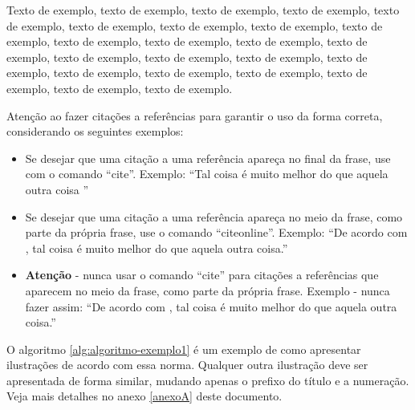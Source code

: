 \documentclass[
	12pt,				%
	oneside,			%
	a4paper,			%
	english,			%
	brazil				%
	]{abntex2ppgsi}
\begin{document}
Texto de exemplo, texto de exemplo, texto de exemplo, texto de exemplo, texto de exemplo, texto de exemplo, texto de exemplo, texto de exemplo, texto de exemplo, texto de exemplo, texto de exemplo, texto de exemplo, texto de exemplo, texto de exemplo, texto de exemplo, texto de exemplo, texto de exemplo, texto de exemplo, texto de exemplo, texto de exemplo, texto de exemplo, texto de exemplo, texto de exemplo.

Atenção ao fazer citações a referências para garantir o uso da forma correta, considerando os seguintes exemplos:
\begin{itemize}
	\item Se desejar que uma citação a uma referência apareça no final da frase, use com o comando ``cite''. Exemplo: ``Tal coisa é muito melhor do que aquela outra coisa \cite{teste1, teste2}''
	\item Se desejar que uma citação a uma referência apareça no meio da frase, como parte da própria frase, use o comando ``citeonline''. Exemplo: ``De acordo com , tal coisa é muito melhor do que aquela outra coisa.''
	\item \textbf{Atenção} - nunca usar o comando ``cite'' para citações a referências que aparecem no meio da frase, como parte da própria frase. Exemplo - nunca fazer assim: ``De acordo com \cite{teste3}, tal coisa é muito melhor do que aquela outra coisa.''
\end{itemize}

O algoritmo \ref{alg:algoritmo-exemplo1} é um exemplo de como apresentar ilustrações de acordo com essa norma. Qualquer outra ilustração deve ser apresentada de forma similar, mudando apenas o prefixo do título e a numeração. Veja mais detalhes no anexo \ref{anexoA} deste documento.
\end{document}
